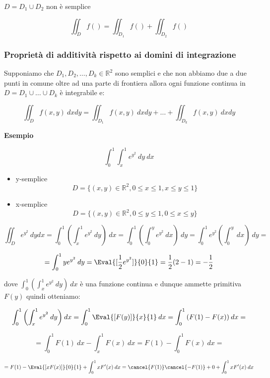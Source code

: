\documentclass[../appunti-analisi.tex]{subfiles}
\begin{document}
$D = D_1 \cup D_2$ non è semplice

\[
    \iint_D {f()} = \iint_{D_1} {f()} + \iint_{D_2} {f()}
\]

\subsubsection{Proprietà di additività rispetto ai domini di integrazione}

Supponiamo che $D_1,D_2,\ldots,D_k \in \mathbb{R}^{2}$ sono semplici e che non abbiamo due a due punti in comune oltre ad una parte di frontiera allora ogni funzione continua in $D = D_1 \cup \ldots \cup D_k$ è integrabile e:

\[
    \iint_D {f(x,y)} \: d x d y = \iint_{D_1} {f(x,y)} \: d x d y + \ldots + \iint_{D_k} {f(x,y)} \: d x d y  
\]

\newpage

\textbf{Esempio}

\[
    \int_{0}^{1} {\int_{x}^{1} {e ^{y^{2}}} \: dy } \: dx 
\]

\begin{itemize}
    \item y-semplice
        \[
            D = \{(x,y) \in \mathbb{R}^{2}, 0 \le x \le 1, x \le y \le 1\}
        \]
    \item x-semplice
        \[
            D = \{(x,y) \in \mathbb{R}^{2}, 0 \le y \le 1, 0 \le x \le y\}
        \]
\end{itemize}

\[
    \iint_D {e ^{y^{2}}} \: d y d x = \int_{0}^{1} {\left(\int_{x}^{1} {e ^{y^{2}}} \: d y \right)} \: dx = \int_{0}^{1} {\left(\int_{0}^{y} {e ^{y^{2}}} \: dx \right)} \: d  y = \int_{0}^{1} {e ^{y^{2}}\left(\int_{0}^{y} {} \: dx \right)} \: dy  =
\]

\[
    = \int_{0}^{1} {y e ^{y^{2}}} \: dy  = \Eval{[\frac{1}{2} e ^{y^{2}}]}{0}{1} = \frac{1}{2} (2 -1) = -\frac{1}{2}
\]

dove $\int_{0}^{1} {\left(\int_{x}^{1} {e ^{y^{2}}} \: dy \right)} \: dx $ è una funzione continua e dunque ammette primitiva $F(y)$ quindi otteniamo:

\[
    \int_{0}^{1} {\left(\int_{x}^{1} {e ^{y^{2}}} \: dy \right)} \: dx  = \int_{0}^{1} {\Eval{[F(y)]}{x}{1} } \: dx = \int_{0}^{1} {\left(F(1) - F(x) \right)} \: dx =
\]

\[
    = \int_{0}^{1} {F(1)} \: d x - \int_{x}^{1} {F(x)} \: dx = F(1) - \int_{0}^{1} {F(x)} \: dx  =
\]

\[
    = F(1) - \Eval{[xF(x)]}{0}{1} + \int_{0}^{1} {x F'(x)} \: dx = \cancel{F(1)} \cancel{- F(1)} + 0 + \int_{0}^{1} {xF'(x)} \: dx
\]
\end{document}
